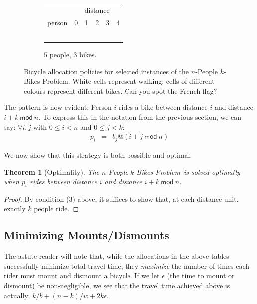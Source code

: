 \documentclass[DIV=calc, paper=a4, fontsize=11pt, twocolumn]{scrartcl}	 %
\newcommand{\initial}[1]{ %
\lettrine[lines=3,lhang=0.3,nindent=0em]{
\color{DarkGoldenrod}
{\textsf{#1}}}{}}
\newcommand\prob{$n$-People $k$-Bikes Problem}
\begin{document}
\begin{figure}[t]
\begin{subfigure}[b]{0.38\textwidth}
\begin{tabular}{rp{1.5em}|p{1.5em}|p{1.5em}|p{1.5em}|p{1.5em}|}
		& \multicolumn{5}{c}{distance} \\
		person & \multicolumn{1}{|c|}{0} & \multicolumn{1}{c|}{1} & \multicolumn{1}{c|}{2} & \multicolumn{1}{c|}{3} & \multicolumn{1}{c|}{4} \\
		\hline
		\multicolumn{1}{r|}{\PA} &\BA&\BB&\BC&   & \\
		\cline{2-6}
		\multicolumn{1}{r|}{\PB} &   &\BA&\BB&\BC& \\
		\cline{2-6}
		\multicolumn{1}{r|}{\PC} &   &   &\BA&\BB&\BC\\
		\cline{2-6}
		\multicolumn{1}{r|}{\PD} &\BC&   &   &\BA&\BB\\
		\cline{2-6}
		\multicolumn{1}{r|}{\PE} &\BB&\BC&   &   &\BA\\
		\cline{2-6}
		\end{tabular}
		\caption{$5$ people, $3$ bikes.}
	\end{subfigure}
	\caption{Bicycle allocation policies for selected instances of the \prob. White cells represent walking; cells of different colours represent different bikes.
		Can you spot the French flag?}
	\label{fig:grids}
\end{figure}

The pattern is now evident: Person $i$ rides a bike between distance $i$ and distance $i+k~\mathsf{mod}~n$.
To express this in the notation from the previous section, we can say: $\forall i,j$ with $0\le i < n$ and $0 \le j < k$:
\begin{eqnarray*}
	p_i  &=& b_j @ (i+j~\mathsf{mod}~n)
\end{eqnarray*}

We now show that this strategy is both possible and optimal.

\newtheorem{theorem}{Theorem}

\begin{theorem}[Optimality]
The \prob~is solved optimally when $p_i$ rides between distance $i$ and distance $i+k~\mathsf{mod}~n$.
\end{theorem}
\begin{proof}
By condition (3) above, it suffices to show that, at each distance unit, exactly $k$ people ride.
\end{proof}

\subsection{Minimizing Mounts/Dismounts}

\initial{T}he astute reader will note that, while the allocations in the above tables successfully minimize total travel time, they {\em maximize} the number of times each rider must mount and dismount a bicycle. If we let $\epsilon$ (the time to mount or dismount) be non-negligible, we see that the travel time achieved above is actually: $k/b+(n-k)/w + 2k\epsilon$.
\end{document}
